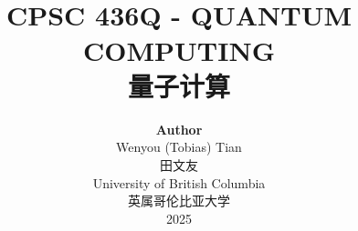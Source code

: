 \title{ \normalsize \textsc{}
		\\ [2.0cm]
		\HRule{1.5pt} \\
		\LARGE \textbf{\uppercase{CPSC 436Q - Quantum Computing}
		\HRule{2.0pt} \\ [0.6cm] \LARGE{量子计算} \vspace*{10\baselineskip}}
		}
\date{}
\author{\textbf{Author} \\ 
		Wenyou (Tobias) Tian \\
        田文友 \\
		University of British Columbia \\
        英属哥伦比亚大学 \\
		2025}

\maketitle
\newpage

\tableofcontents
\newpage